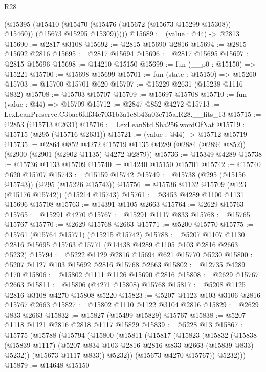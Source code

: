 \begin{lexlean}{R28}
\begin{coremodule}
        (@15395
          (@15410
            (@15470 (@15476 (@15672 (@15673 @15299 @15308)) @15460))
            (@15673 @15295 @15309)))))
@15689 := (value : @44) -> @2813
@15690 := @2817 @3108
@15692 := @2815 @15690 @2816
@15694 := @2815 @15692 @2816
@15695 := @2817 @15694
@15696 := @2817 @15695
@15697 := @2815 @15696
@15698 := @14210 @15150
@15699 := fun (__p0 : @15150) => @15221
@15700 := @15698 @15699
@15701 := fun (state : @15150) => @15260
@15703 := @15700 @15701 @620
@15707 := @15229 @2631 (@15238 @1116 @832)
@15708 := @15703 @15707
@15709 := @15697 @15708
@15710 := fun (value : @44) => @15709
@15712 := @2847 @852 @4272
@15713 := LexLeanPreserve.C3bac6fdf34e7031b3a1c8b43a03c715a.R28.__fits_13
@15715 := @2853 (@15713 @2631)
@15716 := LexLeanStd.Sha256.wordOfNat
@15719 := @15715 (@295 (@15716 @2631))
@15721 := (value : @44) -> @15712 @15719
@15735 := @2864
    @852
    @4272
    @15719
    @1135
    @4289
    (@2884 (@2894 @852))
    (@2900 (@2901 (@2902 @1135) @4272 @2879))
@15736 := @15349 @4289
@15738 := @15736 @1133 @15709
@15740 := @14240 @15150 @15701
@15742 := @15740 @620 @15707
@15743 := @15159 @15742
@15749 := @15738 (@295 (@15156 @15743)) (@295 (@15226 @15743))
@15756 := @15736 @1132 @15709 (@123 (@15176 @15742)) (@15214 @15743)
@15761 := @3453 @4289 @1100 @1131 @15696 @15708
@15763 := @14391 @1105 @2663
@15764 := @2629 @15763
@15765 := @15291 @4270
@15767 := @15291 @1117 @833
@15768 := @15765 @15767
@15770 := @2629 @15768 @2663
@15771 := @5200 @15770
@15775 := @15761 (@15764 @15771) (@15215 @15742)
@15788 := @5207 @1107 @1130 @2816 @15695 @15763 @15771 (@14438 @4289 @1105 @103 @2816 @2663 @5232)
@15794 := @5222 @1129 @2816 @15694 @621 @15770 @5230
@15800 := @5207 @1127 @103 @15692 @2816 @15768 @2663
@15802 := @12735 @4289 @170
@15806 := @15802 @1111 @1126 @15690 @2816
@15808 := @2629 @15767 @2663
@15811 := @15806 (@4271 @15808) @15768
@15817 := @5208 @1125 @2816 @3108 @4270 @15808 @5220
@15823 := @5207 @1123 @103 @3106 @2816 @15767 @2663
@15827 := @15802 @1110 @1122 @3104 @2816
@15829 := @2629 @833 @2663
@15832 := @15827 (@15499 @15829) @15767
@15838 := @5207 @1118 @1121 @2816 @2818 @1117 @15829
@15839 := @5228 @13
@15867 := @15775
    (@15788
      (@15794
        (@15800
          (@15811
            (@15817
              (@15823
                (@15832
                  (@15838
                    (@15839 @1117)
                    (@5207 @834 @103 @2816 @2816 @833 @2663 (@15839 @833) @5232))
                  (@15673 @1117 @833))
                @5232))
            (@15673 @4270 @15767))
          @5232)))
@15879 := @14648
    @15150

\end{coremodule}
\end{lexlean}
